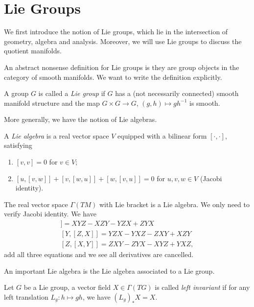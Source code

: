 \section{Lie Groups}

We first introduce the notion of Lie groups, which lie in the intersection of geometry, algebra and analysis.
Moreover, we will use Lie groups to discuss the quotient manifolds.

An abstract nonsense definition for Lie groups is they are group objects in the category of smooth manifolds.
We want to write the definition explicitly.
\begin{defn}
    A group $G$ is called a \emph{Lie group} if $G$ has a (not necessarily connected) smooth manifold structure and the map $G\times G\to G$, $(g,h)\mapsto gh^{-1}$ is smooth.
\end{defn}

More generally, we have the notion of Lie algebras.
\begin{defn}
    A \emph{Lie algebra} is a real vector space $V$ equipped with a bilinear form $[\cdot,\cdot]$, satisfying
    \begin{enumerate}[(1)]
        \item $[v,v]=0$ for $v\in V$;
        \item $[u,[v,w]]+[v,[w,u]]+[w,[v,u]]=0$ for $u,v,w\in V$ (Jacobi identity).
    \end{enumerate}
\end{defn}

\begin{eg}\label{Jacobi identity for vector fields}
    The real vector space $\Gamma(TM)$ with Lie bracket is a Lie algebra.
    We only need to verify Jacobi identity.
    We have
    \begin{gather*}
        [X,[Y,Z]]=XYZ-XZY-YZX+ZYX\\
        [Y,[Z,X]]=YZX-YXZ-ZXY+XZY\\
        [Z,[X,Y]]=ZXY-ZYX-XYZ+YXZ,
    \end{gather*}
    add all three equations and we see all derivatives are cancelled.
\end{eg}

An important Lie algebra is the Lie algebra associated to a Lie group.

\begin{defn}
    Let $G$ be a Lie group, a vector field $X\in\Gamma(TG)$ is called \emph{left invariant} if for any left translation $L_g:h\mapsto gh$, we have $(L_g)_*X=X$.
\end{defn}

